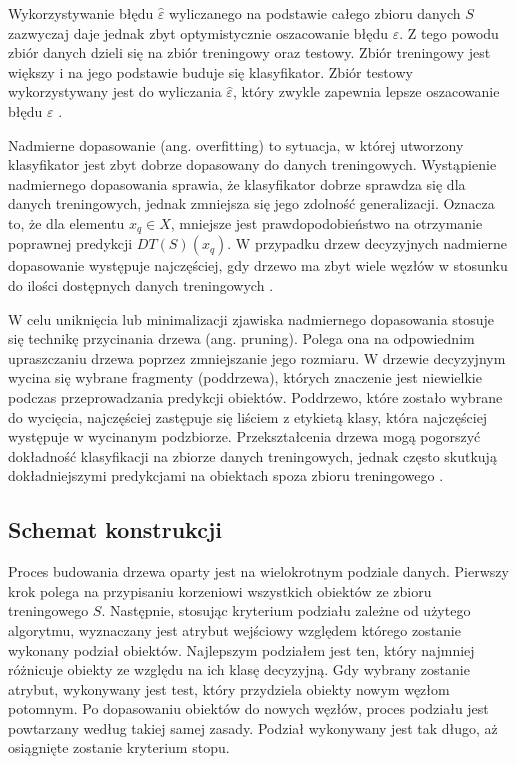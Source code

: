 \documentclass[12pt]{article}
\begin{document}
\vspace{0.8cm}

Wykorzystywanie błędu $\hat{\varepsilon}$ wyliczanego na podstawie całego zbioru danych $S$ zazwyczaj daje jednak
zbyt optymistycznie oszacowanie błędu $\varepsilon$. Z tego powodu zbiór danych dzieli się na zbiór
treningowy oraz testowy. Zbiór treningowy jest większy i na jego podstawie buduje się klasyfikator.
Zbiór testowy wykorzystywany jest do wyliczania $\hat{\varepsilon}$, który zwykle zapewnia
lepsze oszacowanie błędu $\varepsilon$ \cite{data-mining-with-decision-trees}.

Nadmierne dopasowanie (ang. overfitting) to sytuacja, w której utworzony klasyfikator jest zbyt
dobrze dopasowany do danych treningowych. Wystąpienie nadmiernego dopasowania sprawia, że
klasyfikator dobrze sprawdza się dla danych treningowych, jednak zmniejsza się jego zdolność
generalizacji. Oznacza to, że dla elementu $x_q \in X$, mniejsze jest prawdopodobieństwo na otrzymanie
poprawnej predykcji $DT(S)(x_q)$. W przypadku drzew decyzyjnych nadmierne dopasowanie
występuje najczęściej, gdy drzewo ma zbyt wiele węzłów w stosunku do ilości dostępnych danych treningowych \cite{classification-problem-decision-trees}.

W celu uniknięcia lub minimalizacji zjawiska nadmiernego dopasowania stosuje się technikę przycinania drzewa (ang. pruning).
Polega ona na odpowiednim upraszczaniu drzewa poprzez zmniejszanie jego rozmiaru.
W drzewie decyzyjnym wycina się wybrane fragmenty (poddrzewa), których znaczenie jest niewielkie podczas przeprowadzania
predykcji obiektów. Poddrzewo, które zostało wybrane do wycięcia, najczęściej zastępuje się liściem z etykietą klasy, która
najczęściej występuje w wycinanym podzbiorze. Przekształcenia drzewa mogą pogorszyć dokładność klasyfikacji
na zbiorze danych treningowych, jednak często skutkują dokładniejszymi predykcjami na obiektach spoza zbioru treningowego \cite{classification-problem-decision-trees}.

\subsection{Schemat konstrukcji}
Proces budowania drzewa oparty jest na wielokrotnym podziale danych. Pierwszy krok polega na przypisaniu
korzeniowi wszystkich obiektów ze zbioru treningowego $S$. Następnie, stosując kryterium podziału zależne od
użytego algorytmu, wyznaczany jest atrybut wejściowy względem którego zostanie wykonany podział obiektów.
Najlepszym podziałem jest ten, który najmniej różnicuje obiekty ze względu na ich klasę decyzyjną.
Gdy wybrany zostanie atrybut, wykonywany jest test, który przydziela obiekty nowym węzłom potomnym.
Po dopasowaniu obiektów do nowych węzłów, proces podziału jest powtarzany według takiej samej zasady.
Podział wykonywany jest tak długo, aż osiągnięte zostanie kryterium stopu.
\end{document}
